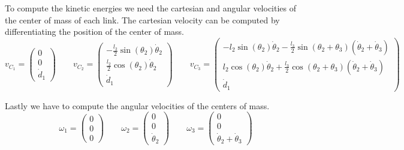 \documentclass[10pt,a4paper]{article}
\begin{document}
To compute the kinetic energies we need the cartesian and angular velocities of the center of mass of each link.
The cartesian velocity can be computed by differentiating the position of the center of mass.
\begin{equation*}
  v_{C_{1}} = \begin{pmatrix}
    0\\
    0\\
    \dot{d}_{1}
  \end{pmatrix}
  \qquad
  v_{C_{2}} = \begin{pmatrix}
    -\frac{l_{2}}{2}\sin(\theta_{2})\dot{\theta}_{2}\\
    \frac{l_{2}}{2}\cos(\theta_{2})\dot{\theta}_{2}\\
    \dot{d}_{1}
  \end{pmatrix}
  \qquad
  v_{C_{3}} = \begin{pmatrix}
    -l_{2}\sin(\theta_{2})\dot{\theta}_{2} - \frac{l_{3}}{2}\sin(\theta_{2} + \theta_{3})(\dot{\theta}_{2} + \dot{\theta}_{3})\\
    l_{2}\cos(\theta_{2})\dot{\theta}_{2} + \frac{l_{3}}{2}\cos(\theta_{2} + \theta_{3})(\dot{\theta}_{2} + \dot{\theta}_{3})\\
    \dot{d}_{1}
  \end{pmatrix}
\end{equation*}

Lastly we have to compute the angular velocities of the centers of mass.
\begin{equation*}
  \omega_{1} = \begin{pmatrix}
    0\\
    0\\
    0
  \end{pmatrix}
  \qquad
  \omega_{2} = \begin{pmatrix}
    0\\
    0\\
    \dot{\theta}_{2}
  \end{pmatrix}
  \qquad
  \omega_{3} = \begin{pmatrix}
    0\\
    0\\
    \dot{\theta}_{2} + \dot{\theta}_{3}
  \end{pmatrix}
\end{equation*}
\end{document}
